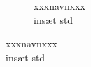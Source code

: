 \begin{titlepage}
\begin{figure}[b!]
\begin{subfigure}[1]{0.20\linewidth}
    \captionsetup{justification=centering}
    \caption[]{{\small xxxnavnxxx}\\{insæt std}}
    \end{subfigure}
    \hspace{2em}
    \vspace{20mm}
\end{figure}
\end{titlepage}